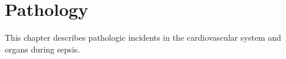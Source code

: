 \chapter{Pathology}
This chapter describes pathologic incidents in the cardiovascular system and organs during sepsis.